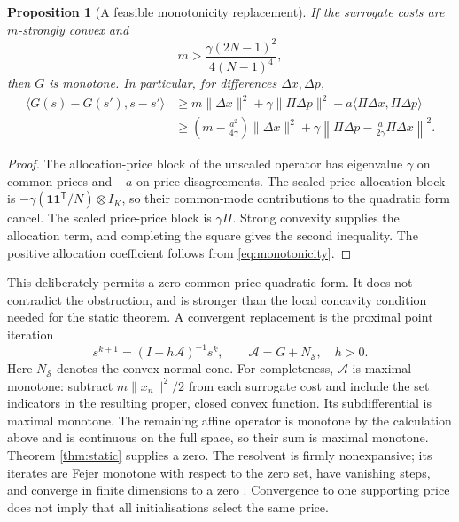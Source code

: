 \documentclass[11pt,a4paper]{article}
\newtheorem{proposition}{Proposition}
\newcommand{\one}{\mathbf 1}
\begin{document}
\begin{proposition}[A feasible monotonicity replacement]
If the surrogate costs are $m$-strongly convex and
\begin{equation}
 m>\frac{\gamma(2N-1)^2}{4(N-1)^4},
 \label{eq:monotonicity}
\end{equation}
then $G$ is monotone. In particular, for differences $\Delta x,\Delta p$,
\begin{align}
 \langle G(s)-G(s'),s-s'\rangle
 &\geq m\|\Delta x\|^2+\gamma\|\Pi\Delta p\|^2
                 -a\langle\Pi\Delta x,\Pi\Delta p\rangle\\
 &\geq\left(m-\frac{a^2}{4\gamma}\right)\|\Delta x\|^2
       +\gamma\left\|\Pi\Delta p-
                          \frac{a}{2\gamma}\Pi\Delta x\right\|^2.
 \label{eq:monotone-bound}
\end{align}
\end{proposition}
\begin{proof}
The allocation-price block of the unscaled operator has eigenvalue
$\gamma$ on common prices and $-a$ on price disagreements. The scaled
price-allocation block is $-\gamma(\one\one^{\mathsf T}/N)\otimes I_K$,
so their common-mode contributions to the quadratic form cancel.
The scaled price-price block is $\gamma\Pi$. Strong convexity supplies
the allocation term, and completing the square gives the second inequality.
The positive allocation coefficient follows from \eqref{eq:monotonicity}.
\end{proof}

This deliberately permits a zero common-price quadratic form. It does not
contradict the obstruction, and is stronger than the local concavity
condition needed for the static theorem. A convergent replacement is the
proximal point iteration
\begin{equation}
 s^{k+1}=(I+h\mathcal A)^{-1}s^k,
 \qquad \mathcal A=G+N_{\mathcal S},\quad h>0.
 \label{eq:ppa}
\end{equation}
Here $N_{\mathcal S}$ denotes the convex normal cone. For completeness,
$\mathcal A$ is maximal monotone: subtract $m\|x_n\|^2/2$ from each
surrogate cost and include the set indicators in the resulting proper,
closed convex function. Its subdifferential is maximal monotone. The
remaining affine operator is monotone by the calculation above and is
continuous on the full space, so their sum is maximal monotone. Theorem
\ref{thm:static} supplies a zero. The resolvent is firmly nonexpansive;
its iterates are Fejer monotone with respect to the zero set, have
vanishing steps, and converge in finite dimensions to a zero
\cite{rockafellar}. Convergence to one supporting price does not imply
that all initialisations select the same price.
\end{document}

